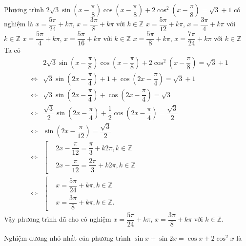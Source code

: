 \begin{ex}%
	Phương trình $2\sqrt{3}\sin\left(x-\dfrac{\pi}{8}\right)\cos\left(x-\dfrac{\pi}{8}\right)+2\cos^2\left(x-\dfrac{\pi}{8}\right) = \sqrt{3}+1$ có nghiệm là
	\choice
	{\True $x=\dfrac{5\pi}{24}+k\pi$, $x=\dfrac{3\pi}{8}+k\pi$ với $k\in\mathbb{Z}$}
	{$x=\dfrac{5\pi}{12}+k\pi$, $x=\dfrac{3\pi}{4}+k\pi$ với $k\in\mathbb{Z}$}
	{$x=\dfrac{5\pi}{4}+k\pi$, $x=\dfrac{5\pi}{16}+k\pi$ với $k\in\mathbb{Z}$}
	{$x=\dfrac{5\pi}{8}+k\pi$, $x=\dfrac{7\pi}{24}+k\pi$ với $k\in\mathbb{Z}$}
	\loigiai
	{
		Ta có
		\allowdisplaybreaks
		\begin{eqnarray*}
			&& 2\sqrt{3}\sin\left(x-\dfrac{\pi}{8}\right)\cos\left(x-\dfrac{\pi}{8}\right)+2\cos^2\left(x-\dfrac{\pi}{8}\right) = \sqrt{3}+1\\
			&\Leftrightarrow & \sqrt{3}\sin\left(2x-\dfrac{\pi}{4}\right)+1+\cos\left(2x-\dfrac{\pi}{4}\right) = \sqrt{3}+1\\
			&\Leftrightarrow & \sqrt{3}\sin\left(2x-\dfrac{\pi}{4}\right)+\cos\left(2x-\dfrac{\pi}{4}\right) = \sqrt{3}\\
			&\Leftrightarrow & \dfrac{\sqrt{3}}{2}\sin\left(2x-\dfrac{\pi}{4}\right)+\dfrac{1}{2}\cos\left(2x-\dfrac{\pi}{4}\right) = \dfrac{\sqrt{3}}{2}\\
			&\Leftrightarrow & \sin\left(2x-\dfrac{\pi}{12}\right) = \dfrac{\sqrt{3}}{2}\\
			&\Leftrightarrow & \left[\begin{aligned}&2x-\dfrac{\pi}{12}=\dfrac{\pi}{3}+k2\pi,k\in\mathbb{Z} \\&2x-\dfrac{\pi}{12}=\dfrac{2\pi}{3}+k2\pi,k\in\mathbb{Z}\end{aligned}\right.\\
			&\Leftrightarrow & \left[\begin{aligned}&x=\dfrac{5\pi}{24}+k\pi,k\in\mathbb{Z} \\&x=\dfrac{3\pi}{8}+k\pi,k\in\mathbb{Z}.\end{aligned}\right.
		\end{eqnarray*}
		Vậy phương trình đã cho có nghiệm $x=\dfrac{5\pi}{24}+k\pi$, $x=\dfrac{3\pi}{8}+k\pi$ với $k\in\mathbb{Z}$.
	}
\end{ex}
\begin{ex}%
	Nghiệm dương nhỏ nhất của phương trình $\sin x+\sin 2x=\cos x+2\cos^2 x$ là
\end{ex}
